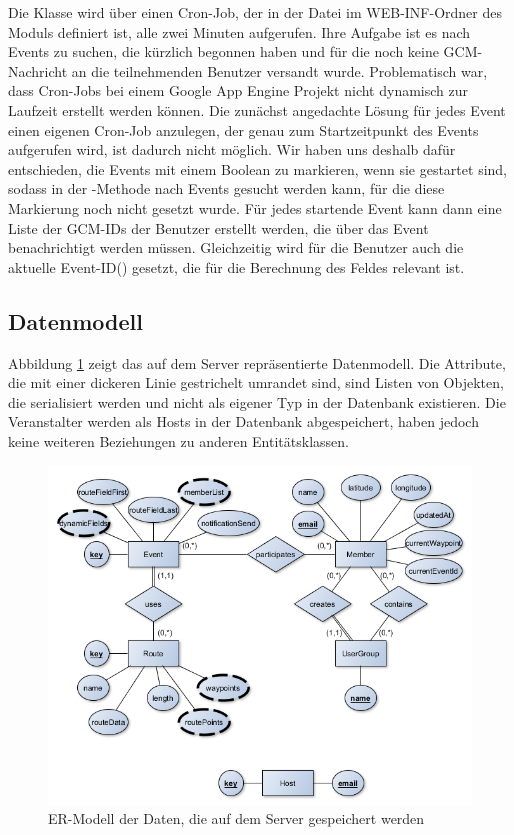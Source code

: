 Die Klasse  wird über einen Cron-Job, der in der Datei  im WEB-INF-Ordner des Moduls definiert ist, alle zwei Minuten aufgerufen. Ihre Aufgabe ist es nach Events zu suchen, die kürzlich begonnen haben und für die noch keine GCM-Nachricht an die teilnehmenden Benutzer versandt wurde. Problematisch war, dass Cron-Jobs bei einem Google App Engine Projekt nicht dynamisch zur Laufzeit erstellt werden können. Die zunächst angedachte Lösung für jedes Event einen eigenen Cron-Job anzulegen, der genau zum Startzeitpunkt des Events aufgerufen wird, ist dadurch nicht möglich. Wir haben uns deshalb dafür entschieden, die Events mit einem Boolean zu markieren, wenn sie gestartet sind, sodass in der -Methode nach Events gesucht werden kann, für die diese Markierung noch nicht gesetzt wurde. Für jedes startende Event kann dann eine Liste der GCM-IDs der Benutzer erstellt werden, die über das Event benachrichtigt werden müssen. Gleichzeitig wird für die Benutzer auch die aktuelle Event-ID() gesetzt, die für die Berechnung des Feldes relevant ist.

\subsection{Datenmodell}
Abbildung \ref{fig:backend_er} zeigt das auf dem Server repräsentierte Datenmodell. Die Attribute, die mit einer dickeren Linie gestrichelt umrandet sind, sind Listen von Objekten, die serialisiert werden und nicht als eigener Typ in der Datenbank existieren. Die Veranstalter werden als Hosts in der Datenbank abgespeichert, haben jedoch keine weiteren Beziehungen zu anderen Entitätsklassen.

\begin{figure}[htb]
\centering
\includegraphics[width=\textwidth]{graphics/backend_er.png}
\caption{ER-Modell der Daten, die auf dem Server gespeichert werden}
\label{fig:backend_er}
\end{figure}

